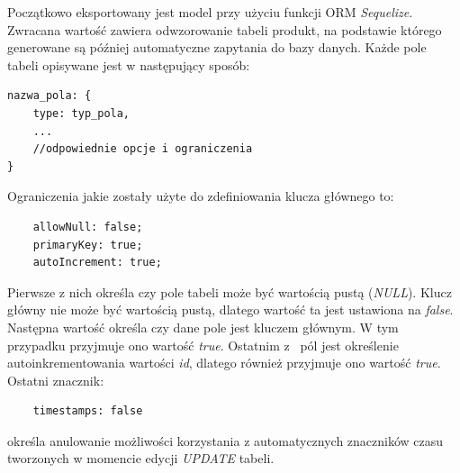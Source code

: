 Początkowo eksportowany jest model przy użyciu funkcji ORM \textit{Sequelize}. Zwracana wartość zawiera odwzorowanie tabeli produkt, na podstawie którego generowane są później automatyczne zapytania do bazy danych. Każde pole tabeli opisywane jest w następujący sposób:

\begin{verbatim}
nazwa_pola: {
	type: typ_pola,
	...
	//odpowiednie opcje i ograniczenia
}
\end{verbatim}

Ograniczenia jakie zostały użyte do zdefiniowania klucza głównego to:

	\begin{verbatim}
	allowNull: false;
	primaryKey: true;
	autoIncrement: true;
	\end{verbatim}

Pierwsze z nich określa czy pole tabeli może być wartością pustą (\textit{NULL}). Klucz główny nie może być wartością pustą, dlatego wartość ta jest ustawiona na \textit{false}. Następna wartość określa czy dane pole jest kluczem głównym. W tym przypadku przyjmuje ono wartość \textit{true}. Ostatnim z~ pól jest określenie autoinkrementowania wartości \textit{id}, dlatego również przyjmuje ono wartość \textit{true}. Ostatni znacznik:

	\begin{verbatim}
	timestamps: false
	\end{verbatim}
określa anulowanie możliwości korzystania z automatycznych znaczników czasu tworzonych w momencie edycji \textit{UPDATE} tabeli.
